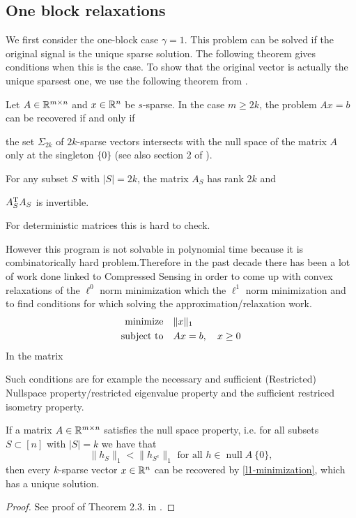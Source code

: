 \documentclass{article} %
\renewcommand{\null}{\operatorname{null}}
\begin{document}
\subsection{One block relaxations}
We first consider the one-block case $\gamma = 1$. 
This problem can be solved if the original signal is the unique sparse solution. The following theorem gives conditions when this is the case. To show that the original vector is actually the unique sparsest one, we use the following theorem from \cite{Dahmen_CS}.
\begin{theorem}
\label{thm:l0unique}
Let $A \in \mathbb{R}^{m\times n}$ and $x\in\mathbb{R}^n$ be $s$-sparse. In the case
$m\geq 2k$, the problem $Ax = b$ can be recovered if and only if
\begin{compactenum}[(a)]
\item the set $\Sigma_{2k}$ of $2k$-sparse vectors intersects with the null space of the matrix $A$ only at the singleton $\{0\}$ (see also section 2 of \cite{Dahmen_CS}).
\item For any subset $S$ with $|S| = 2k$, the matrix $A_S$ has rank $2k$ and
\item $A_S^{\rm T} A_S$ is invertible.
\end{compactenum}
\end{theorem}
For deterministic matrices this is hard to check.

However this program is not solvable in polynomial time because it is combinatorically hard problem.Therefore in the past decade there has been a lot of work done linked to Compressed Sensing in order to come up with convex relaxations of the $\ell^0$ norm minimization which the $\ell^1$ norm minimization and to find conditions for which solving the approximation/relaxation work.
\begin{equation}\label{l1-minimization}
  \begin{split}
    \text{minimize} &\quad \lVert x\rVert_1\\
    \text{subject to} &\quad Ax = b,\quad x\geq 0
  \end{split}
\end{equation}
In the matrix

Such conditions are for example the necessary and sufficient (Restricted) Nullspace property/restricted eigenvalue property and the sufficient restriced isometry property. 
\begin{theorem}
If a matrix $A \in \mathbb{R}^{m\times n}$ satisfies the null space property, i.e. for all subsets $S \subset [n]$ with $|S| = k$ we have that
\begin{equation*}
\|h_S\|_1 < \|h_{S^c}\|_1 \text{ for all } h\in\null A \ \{0\},
\end{equation*}
then every $k$-sparse vector $x \in \mathbb{R}^n$ can be recovered by \eqref{l1-minimization}, which has a unique solution.
\end{theorem}
\begin{proof}
See proof of Theorem 2.3. in \cite{Rauhut}.
\end{proof}
\end{document}
